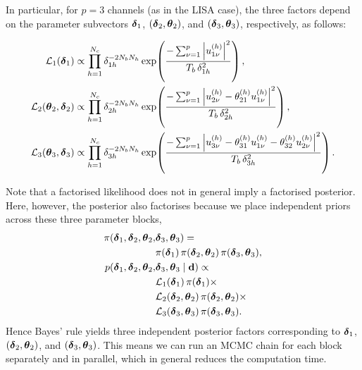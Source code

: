\documentclass[%
	reprint,
	nofootinbib,
	amsmath,
	amssymb,
	aps,
]{revtex4-2}
\begin{document}
	In particular, for $p=3$ channels (as in the LISA case), the three
	factors depend on the parameter subvectors $\mbox{\boldmath $\delta$}_{1}$,
	$(\mbox{\boldmath $\delta$}_{2},\mbox{\boldmath $\theta$}_{2})$, and $(\mbox{\boldmath $\delta$}_{3},\mbox{\boldmath $\theta$}_{3})$,
	respectively, as follows:
	\begin{widetext}
	\begin{align}
		\mathcal{L}_{1}(\mbox{\boldmath $\delta$}_{1})
		&\propto \prod_{h=1}^{N_{c}}\delta_{1h}^{-2N_{b}N_{h}}
		  \exp\!\left(\frac{-\sum_{\nu=1}^{p}\left|u_{1\nu}^{(h)}\right|^{2}}
		              {T_{b}\,\delta_{1h}^{2}}\right), \label{eq:likelihood1}\\
		\mathcal{L}_{2}(\mbox{\boldmath $\theta$}_{2},\mbox{\boldmath $\delta$}_{2})
		&\propto \prod_{h=1}^{N_{c}}\delta_{2h}^{-2N_{b}N_{h}}
		  \exp\!\left(\frac{-\sum_{\nu=1}^{p}\left|u_{2\nu}^{(h)}-\theta_{21}^{(h)}u_{1\nu}^{(h)}\right|^{2}}
		              {T_{b}\,\delta_{2h}^{2}}\right), \label{eq:likelihood2}\\
		\mathcal{L}_{3}(\mbox{\boldmath $\theta$}_{3},\mbox{\boldmath $\delta$}_{3})
		&\propto \prod_{h=1}^{N_{c}}\delta_{3h}^{-2N_{b}N_{h}}
		  \exp\!\left(\frac{-\sum_{\nu=1}^{p}\left|u_{3\nu}^{(h)}-\theta_{31}^{(h)}u_{1\nu}^{(h)}-\theta_{32}^{(h)}u_{2\nu}^{(h)}\right|^{2}}
		              {T_{b}\,\delta_{3h}^{2}}\right). \label{eq:likelihood3}
	\end{align}
	\end{widetext}%
	Note that a factorised likelihood does not in general imply a factorised
	posterior. Here, however, the posterior also factorises because we place independent
	priors across these three parameter blocks,
	\begin{align}
		\pi(\mbox{\boldmath $\delta$}_{1},\mbox{\boldmath $\delta$}_{2},\mbox{\boldmath $\theta$}_{2}, & \mbox{\boldmath $\delta$}_{3},\mbox{\boldmath $\theta$}_{3}) = \notag                                                                         \\
		                                         & \pi(\mbox{\boldmath $\delta$}_{1})\,\pi(\mbox{\boldmath $\delta$}_{2},\mbox{\boldmath $\theta$}_{2})\,\pi(\mbox{\boldmath $\delta$}_{3},\mbox{\boldmath $\theta$}_{3}),                             \\
		p(\mbox{\boldmath $\delta$}_{1},\mbox{\boldmath $\delta$}_{2},\mbox{\boldmath $\theta$}_{2},   & \mbox{\boldmath $\delta$}_{3},\mbox{\boldmath $\theta$}_{3}\mid {\bf d}) \propto \notag                                    \\
		                                         & \mathcal{L}_{1}(\mbox{\boldmath $\delta$}_{1})\,\pi(\mbox{\boldmath $\delta$}_{1})\times \notag                                  \\
		                                         & \mathcal{L}_{2}(\mbox{\boldmath $\delta$}_{2},\mbox{\boldmath $\theta$}_{2})\,\pi(\mbox{\boldmath $\delta$}_{2},\mbox{\boldmath $\theta$}_{2})\times \notag \\
		                                         & \mathcal{L}_{3}(\mbox{\boldmath $\delta$}_{3},\mbox{\boldmath $\theta$}_{3})\,\pi(\mbox{\boldmath $\delta$}_{3},\mbox{\boldmath $\theta$}_{3}).
	\end{align}
	Hence Bayes' rule yields three independent posterior factors corresponding to $\mbox{\boldmath $\delta$}
	_{1}$, $(\mbox{\boldmath $\delta$}_{2},\mbox{\boldmath $\theta$}_{2})$, and $(\mbox{\boldmath $\delta$}_{3},\mbox{\boldmath $\theta$}_{3})$. This
	means we can run an MCMC chain for each block separately and in parallel, which
	in general reduces the computation time.
\end{document}
